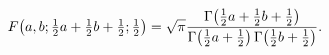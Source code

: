\[\mathop{F\/}\nolimits\!\left(a,b;\tfrac{1}{2}a+\tfrac{1}{2}b+\tfrac{1}{2};%
\tfrac{1}{2}\right)=\sqrt{\pi}\frac{\mathop{\Gamma\/}\nolimits\!\left(\tfrac{1%
}{2}a+\tfrac{1}{2}b+\tfrac{1}{2}\right)}{\mathop{\Gamma\/}\nolimits\!\left(%
\tfrac{1}{2}a+\tfrac{1}{2}\right)\mathop{\Gamma\/}\nolimits\!\left(\tfrac{1}{2%
}b+\tfrac{1}{2}\right)}.\]